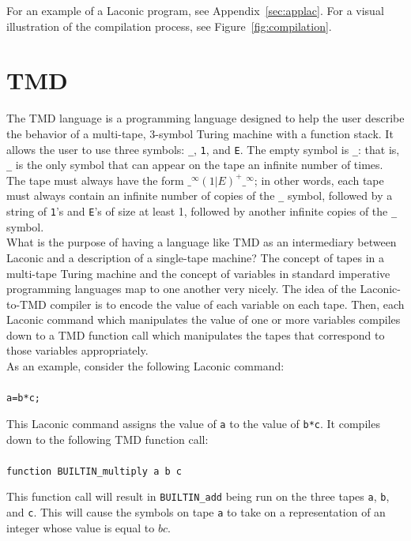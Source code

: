 \documentclass[11pt]{article}
\begin{document}
For an example of a Laconic program, see Appendix~\ref{sec:applac}. For a visual illustration of the compilation process, see Figure~\ref{fig:compilation}.

\section{TMD}

The TMD language is a programming language designed to help the user describe the behavior of a multi-tape, 3-symbol Turing machine with a function stack. It allows the user to use three symbols: \texttt{\_}, \texttt{1}, and \texttt{E}. The empty symbol is \texttt{\_}: that is, \texttt{\_} is the only symbol that can appear on the tape an infinite number of times. The tape must always have the form $\texttt{\_}^{\infty}(1|E)^+\texttt{\_}^{\infty}$; in other words, each tape must always contain an infinite number of copies of the \texttt{\_} symbol, followed by a string of \texttt{1}'s and \texttt{E}'s of size at least 1, followed by another infinite copies of the \texttt{\_} symbol. \\

What is the purpose of having a language like TMD as an intermediary between Laconic and a description of a single-tape machine? The concept of tapes in a multi-tape Turing machine and the concept of variables in standard imperative programming languages map to one another very nicely. The idea of the Laconic-to-TMD compiler is to encode the value of each variable on each tape. Then, each Laconic command which manipulates the value of one or more variables compiles down to a TMD function call which manipulates the tapes that correspond to those variables appropriately. \\

As an example, consider the following Laconic command: \\ \\
\texttt{a=b*c;} 

This Laconic command assigns the value of \texttt{a} to the value of \texttt{b*c}. It compiles down to the following TMD function call: \\ \\
\texttt{function BUILTIN\_multiply a b c}

This function call will result in \texttt{BUILTIN\_add} being run on the three tapes \texttt{a}, \texttt{b}, and \texttt{c}. This will cause the symbols on tape \texttt{a} to take on a representation of an integer whose value is equal to $bc$.
\end{document}
